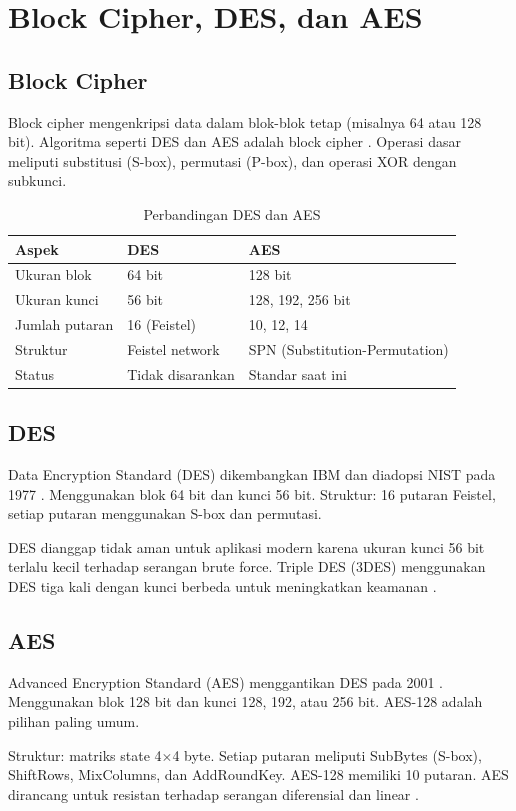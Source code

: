 \section{Block Cipher, DES, dan AES}

\subsection{Block Cipher}
Block cipher mengenkripsi data dalam blok-blok tetap (misalnya 64 atau 128 bit). Algoritma seperti DES dan AES adalah block cipher \cite{stallings2017,schneier1996}. Operasi dasar meliputi substitusi (S-box), permutasi (P-box), dan operasi XOR dengan subkunci.

\begin{table}[!htbp]
\centering
\caption{Perbandingan DES dan AES}
\label{tab:des-aes}
\begin{tabular}{@{}lll@{}}
\toprule
\textbf{Aspek} & \textbf{DES} & \textbf{AES} \\
\midrule
Ukuran blok & 64 bit & 128 bit \\
Ukuran kunci & 56 bit & 128, 192, 256 bit \\
Jumlah putaran & 16 (Feistel) & 10, 12, 14 \\
Struktur & Feistel network & SPN (Substitution-Permutation) \\
Status & Tidak disarankan & Standar saat ini \\
\bottomrule
\end{tabular}
\end{table}

\subsection{DES}
Data Encryption Standard (DES) dikembangkan IBM dan diadopsi NIST pada 1977 \cite{nistfips46}. Menggunakan blok 64 bit dan kunci 56 bit. Struktur: 16 putaran Feistel, setiap putaran menggunakan S-box dan permutasi.

DES dianggap tidak aman untuk aplikasi modern karena ukuran kunci 56 bit terlalu kecil terhadap serangan brute force. Triple DES (3DES) menggunakan DES tiga kali dengan kunci berbeda untuk meningkatkan keamanan \cite{stallings2017,schneier1996}.

\subsection{AES}
Advanced Encryption Standard (AES) menggantikan DES pada 2001 \cite{nistfips197}. Menggunakan blok 128 bit dan kunci 128, 192, atau 256 bit. AES-128 adalah pilihan paling umum.

Struktur: matriks state 4$\times$4 byte. Setiap putaran meliputi SubBytes (S-box), ShiftRows, MixColumns, dan AddRoundKey. AES-128 memiliki 10 putaran. AES dirancang untuk resistan terhadap serangan diferensial dan linear \cite{nistfips197,stallings2017,schneier1996}.
